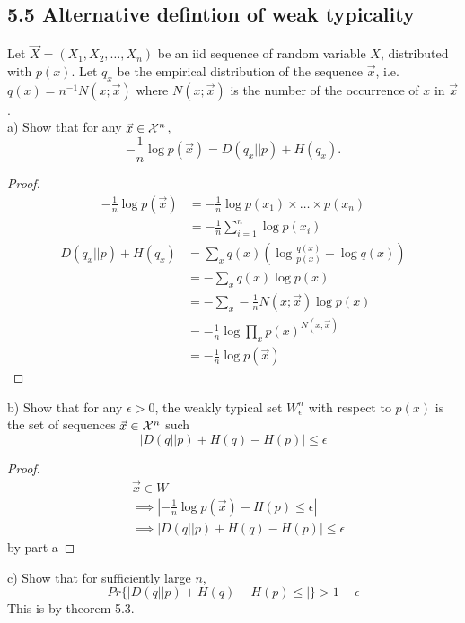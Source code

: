 \documentclass[../main.tex]{subfiles}
\begin{document}
 \subsection*{5.5 Alternative defintion of weak typicality}
 Let $\vec X= (X_1,X_2,\dots,X_n)$ be an iid sequence of random variable $X$, distributed with $p(x)$. Let $q_x$ be the empirical distribution of the sequence $\vec x$, i.e. $q(x)=n^{-1}N(x;\vec x)$ where $N(x;\vec x)$ is the number of the occurrence of $x$ in $\vec x$.
 \\
 a) Show that for any $\vec x\in \mathcal{X}^n$, \[
 -\frac{1}{n}\log p(\vec x)= D(q_x||p)+H(q_x).
 \]
 \begin{proof}
     \begin{align*}
         -\frac{1}{n}\log p(\vec x) &= -\frac{1}{n}\log p(x_1)\times \dots\times p(x_n)\\
         &=-\frac{1}{n}\sum_{i=1}^n\log p(x_i)    
     \end{align*}
     \begin{align*}
         D(q_x||p) + H(q_x) &= \sum_{x} q(x)(\log\frac{q(x)}{p(x)} - \log q(x))\\
         &= -\sum_{x}q(x)\log p(x)\\
         &=-\sum_{x}-\frac{1}{n}N(x;\vec x)\log p(x)\\
         &=-\frac{1}{n}\log \prod_{x}p(x)^{N(x;\vec x)}\\
         &=-\frac{1}{n}\log p(\vec x)
     \end{align*}
 \end{proof}
 b) Show that for any $\epsilon > 0$, the weakly typical set $W^{n}_{\epsilon}$ with respect to $p(x)$ is the set of sequences $\vec x\in \mathcal{X}^n$ such \[
 |D(q||p) + H(q) - H(p)|\leq \epsilon
 \]
 \begin{proof}
     \begin{align*}
         &\vec x \in W\\
         &\implies |-\frac{1}{n}\log p(\vec x)-H(p)\leq \epsilon|\\
         &\implies |D(q||p) + H(q) - H(p)|\leq \epsilon
     \end{align*}
     by part a
 \end{proof}
 c) Show that for sufficiently large $n$, \[
 Pr\{|D(q||p)+H(q)-H(p)\leq |\} > 1-\epsilon
 \]
 This is by theorem 5.3.


 
\end{document}
